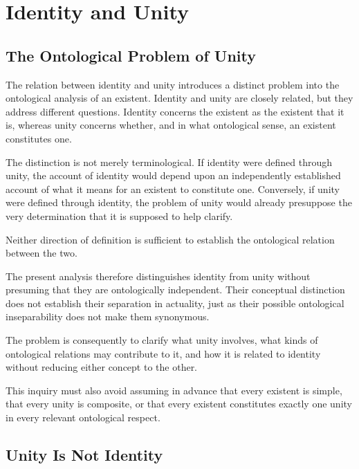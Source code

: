 
\section{Identity and Unity}
\label{sec:identity-and-unity}

\subsection{The Ontological Problem of Unity}

The relation between identity and unity introduces a
distinct problem into the ontological analysis of an
existent. Identity and unity are closely related, but
they address different questions. Identity concerns
the existent as the existent that it is, whereas unity
concerns whether, and in what ontological sense, an
existent constitutes one.

The distinction is not merely terminological. If identity
were defined through unity, the account of identity would
depend upon an independently established account of
what it means for an existent to constitute one. Conversely,
if unity were defined through identity, the problem of
unity would already presuppose the very determination
that it is supposed to help clarify.

Neither direction of definition is sufficient to establish
the ontological relation between the two.

The present analysis therefore distinguishes identity
from unity without presuming that they are ontologically
independent. Their conceptual distinction does not
establish their separation in actuality, just as their
possible ontological inseparability does not make them
synonymous.

The problem is consequently to clarify what unity
involves, what kinds of ontological relations may
contribute to it, and how it is related to identity
without reducing either concept to the other.

This inquiry must also avoid assuming in advance
that every existent is simple, that every unity is
composite, or that every existent constitutes exactly
one unity in every relevant ontological respect.

\subsection{Unity Is Not Identity}


